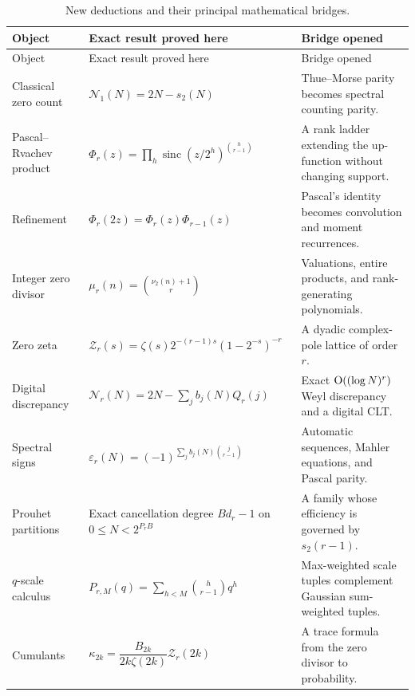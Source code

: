 \documentclass[11pt,oneside]{article}
\theoremstyle{definition}
\theoremstyle{remark}
\newcommand{\sinc}{\operatorname{sinc}}
\begin{document}
\begin{longtable}{@{}>{\raggedright\arraybackslash}p{}>{\raggedright\arraybackslash}p{}>{\raggedright\arraybackslash}p{}@{}}
\caption{New deductions and their principal mathematical bridges.}\label{p3:tab:result-map}\\
\toprule
Object & Exact result proved here & Bridge opened\\
\midrule
\endfirsthead
\toprule
Object & Exact result proved here & Bridge opened\\
\midrule
\endhead
Classical zero count
& $\mathcal N_1(N)=2N-s_2(N)$
& Thue--Morse parity becomes spectral counting parity.\\

Pascal--Rvachev product
& $\Phi_r(z)=\prod_h\sinc(z/2^h)^{\binom h{r-1}}$
& A rank ladder extending the up-function without changing support.\\

Refinement
& $\Phi_r(2z)=\Phi_r(z)\Phi_{r-1}(z)$
& Pascal's identity becomes convolution and moment recurrences.\\

Integer zero divisor
& $\mu_r(n)=\binom{\nu_2(n)+1}{r}$
& Valuations, entire products, and rank-generating polynomials.\\

Zero zeta
& $\mathcal Z_r(s)=\zeta(s)2^{-(r-1)s}(1-2^{-s})^{-r}$
& A dyadic complex-pole lattice of order $r$.\\

Digital discrepancy
& $\mathcal N_r(N)=2N-\sum_jb_j(N)Q_r(j)$
& Exact $\mathrm O((\log N)^r)$ Weyl discrepancy and a digital CLT.\\

Spectral signs
& $\varepsilon_r(N)=(-1)^{\sum_jb_j(N)\binom j{r-1}}$
& Automatic sequences, Mahler equations, and Pascal parity.\\

Prouhet partitions
& Exact cancellation degree $Bd_r-1$ on $0\le N<2^{P_rB}$
& A family whose efficiency is governed by $s_2(r-1)$.\\

$q$-scale calculus
& $P_{r,M}(q)=\sum_{h<M}\binom h{r-1}q^h$
& Max-weighted scale tuples complement Gaussian sum-weighted tuples.\\

Cumulants
& $\kappa_{2k}=\dfrac{B_{2k}}{2k\zeta(2k)}\mathcal Z_r(2k)$
& A trace formula from the zero divisor to probability.\\


\end{longtable}
\end{document}
